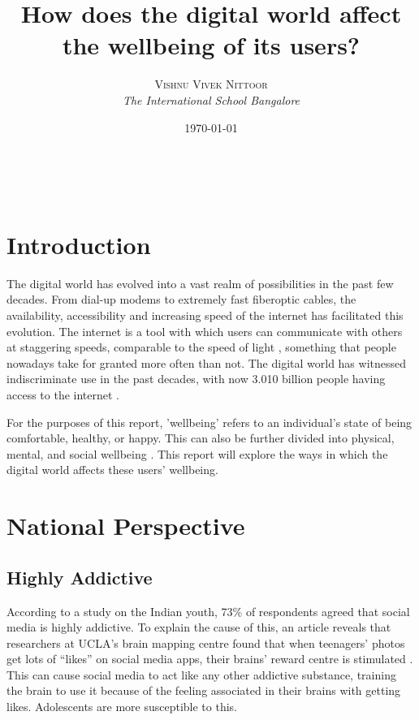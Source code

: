 \documentclass[a4paper, 11pt]{article}
\title{\textbf{How does the digital world affect the wellbeing of its users?}}
\author{\textsc{Vishnu Vivek Nittoor} \\{\textit{The International School Bangalore}}}
\date{\today}
\makeatletter
\renewcommand{\maketitle}{
\begin{flushright}
{\LARGE\@title}

\vspace{20pt}

{\large\@author}
\\\@date %

\vspace{40pt} %
\end{flushright}
}
\makeatother
\begin{document}
\maketitle

\vspace{30pt}

\section*{Introduction}

The digital world has evolved into a vast realm of possibilities in the past few decades. From dial-up modems to extremely fast fiberoptic cables, the availability, accessibility and increasing speed of the internet has facilitated this evolution. The internet is a tool with which users can communicate with others at staggering speeds, comparable to the speed of light \cite{speedoflight-communication} , something that people nowadays take for granted more often than not. The digital world has witnessed indiscriminate use in the past decades, with now 3.010 billion people having access to the internet \cite{world-population-online}.

For the purposes of this report, 'wellbeing' refers to an individual's state of being comfortable, healthy, or happy. This can also be further divided into physical, mental, and social wellbeing \cite{physical-wellbeing-definition, who-mental-wellbeing, social-wellbeing-definition}. This report will explore the ways in which the digital world affects these users' wellbeing.

\section{National Perspective}

\subsection{Highly Addictive}
\label{national-highly-addictive}
According to a study on the Indian youth, 73\% of respondents agreed that social media is highly addictive. To explain the cause of this, an article reveals that researchers at UCLA’s brain mapping centre found that when teenagers’ photos get lots of “likes” on social media apps, their brains’ reward centre is stimulated \cite{teens-social-media-brain}. This can cause social media to act like any other addictive substance, training the brain to use it because of the feeling associated in their brains with getting likes. Adolescents are more susceptible to this.
\end{document}
